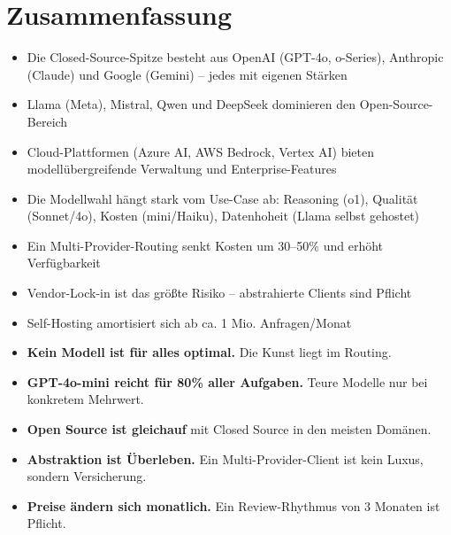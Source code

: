 \section{Zusammenfassung}

\begin{itemize}[leftmargin=*]
    \item Die Closed-Source-Spitze besteht aus OpenAI (GPT-4o, o-Series), Anthropic (Claude) und Google (Gemini) -- jedes mit eigenen Stärken
    \item Llama (Meta), Mistral, Qwen und DeepSeek dominieren den Open-Source-Bereich
    \item Cloud-Plattformen (Azure AI, AWS Bedrock, Vertex AI) bieten modellübergreifende Verwaltung und Enterprise-Features
    \item Die Modellwahl hängt stark vom Use-Case ab: Reasoning (o1), Qualität (Sonnet/4o), Kosten (mini/Haiku), Datenhoheit (Llama selbst gehostet)
    \item Ein Multi-Provider-Routing senkt Kosten um 30--50\% und erhöht Verfügbarkeit
    \item Vendor-Lock-in ist das größte Risiko -- abstrahierte Clients sind Pflicht
    \item Self-Hosting amortisiert sich ab ca. 1 Mio. Anfragen/Monat
\end{itemize}




\par\mbox{}\par
\begin{merkeEnv}
\begin{itemize}
    \item \textbf{Kein Modell ist für alles optimal.} Die Kunst liegt im Routing.
    \item \textbf{GPT-4o-mini reicht für 80\% aller Aufgaben.} Teure Modelle nur bei konkretem Mehrwert.
    \item \textbf{Open Source ist gleichauf} mit Closed Source in den meisten Domänen.
    \item \textbf{Abstraktion ist Überleben.} Ein Multi-Provider-Client ist kein Luxus, sondern Versicherung.
    \item \textbf{Preise ändern sich monatlich.} Ein Review-Rhythmus von 3 Monaten ist Pflicht.
\end{itemize}
\end{merkeEnv}

